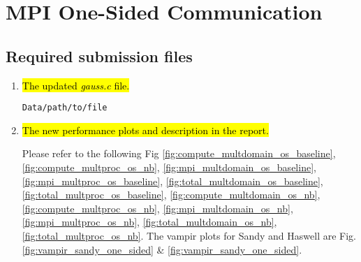 \section{MPI One-Sided Communication}
\subsection{Required submission files}
\begin{enumerate}
  \item \hl{The updated \emph{gauss.c} file.}

    \verb!Data/path/to/file!

  \item \hl{The new performance plots and description in the report.}

	Please refer to the following Fig \ref{fig:compute_multdomain_os_baseline}, \ref{fig:compute_multproc_os_nb}, \ref{fig:mpi_multdomain_os_baseline}, \ref{fig:mpi_multproc_os_baseline}, \ref{fig:total_multdomain_os_baseline}, \ref{fig:total_multproc_os_baseline}, \ref{fig:compute_multdomain_os_nb}, \ref{fig:compute_multproc_os_nb}, \ref{fig:mpi_multdomain_os_nb}, \ref{fig:mpi_multproc_os_nb}, \ref{fig:total_multdomain_os_nb}, \ref{fig:total_multproc_os_nb}. The vampir plots for Sandy and Haswell are Fig. \ref{fig:vampir_sandy_one_sided} \& \ref{fig:vampir_sandy_one_sided}.

\end{enumerate}

